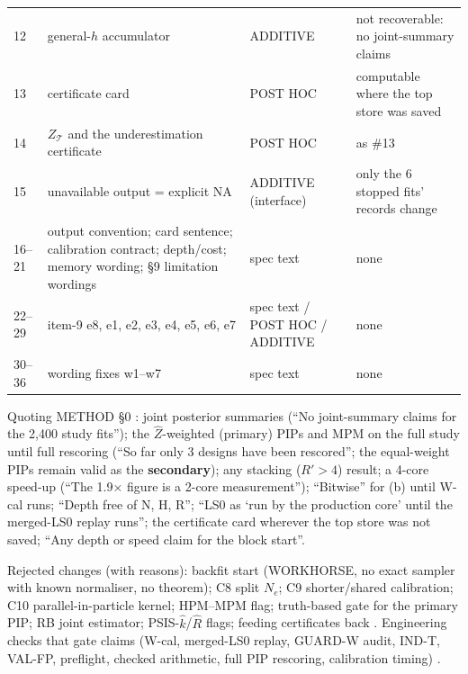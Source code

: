 {\begin{xltabular}{\linewidth}{@{}l>{\raggedright\arraybackslash}X>{\raggedright\arraybackslash}p{2.3cm}>{\raggedright\arraybackslash}X@{}}
12 & general-$h$ accumulator & ADDITIVE & not recoverable: no joint-summary claims \\
13 & certificate card & POST HOC & computable where the top store was saved \\
14 & $Z_{\mathcal T}$ and the underestimation certificate & POST HOC & as \#13 \\
15 & unavailable output = explicit NA & ADDITIVE (interface) & only the 6 stopped fits' records change \\
16--21 & output convention; card sentence; calibration contract; depth/cost; memory wording; \S9 limitation wordings & spec text & none \\
22--29 & item-9 e8, e1, e2, e3, e4, e5, e6, e7 & spec text / POST HOC / ADDITIVE & none \\
30--36 & wording fixes w1--w7 & spec text & none \\
\bottomrule
\end{xltabular}
}

\begin{notproved}
Quoting METHOD \S0 : joint posterior summaries (``No joint-summary claims
for the 2,400 study fits''); the $\hat Z$-weighted (primary) PIPs and MPM on the full study until full rescoring (``So far only 3
designs have been rescored''; the equal-weight PIPs remain valid as the \textbf{secondary}); any stacking ($R'>4$) result; a
4-core speed-up (``The 1.9× figure is a 2-core measurement''); ``Bitwise'' for (b) until W-cal runs; ``Depth free of N, H, R'';
``LS0 as `run by the production core' until the merged-LS0 replay runs''; the certificate card wherever the top store was not
saved; ``Any depth or speed claim for the block start''.
\end{notproved}

Rejected changes (with reasons): backfit start (WORKHORSE, no exact sampler with known normaliser, no theorem); C8 split
$N_e$; C9 shorter/shared calibration; C10 parallel-in-particle kernel; HPM--MPM flag; truth-based gate for the primary PIP;
RB joint estimator; PSIS-$\hat k$/$\hat R$ flags; feeding certificates back .
Engineering checks that gate claims (W-cal, merged-LS0 replay, GUARD-W audit, IND-T, VAL-FP, preflight, checked arithmetic,
full PIP rescoring, calibration timing) .

